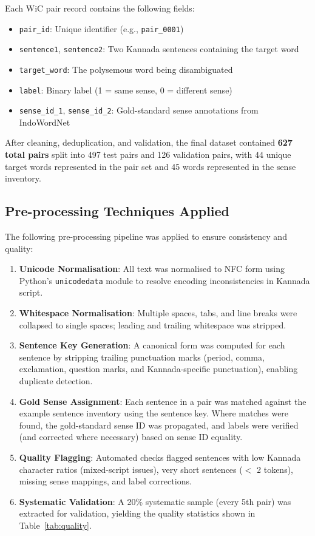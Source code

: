 \documentclass[12pt,a4paper,oneside]{article}
\begin{document}
Each WiC pair record contains the following fields:
\begin{itemize}[leftmargin=*]
  \item \texttt{pair\_id}: Unique identifier (e.g., \texttt{pair\_0001})
  \item \texttt{sentence1}, \texttt{sentence2}: Two Kannada sentences containing the target word
  \item \texttt{target\_word}: The polysemous word being disambiguated
  \item \texttt{label}: Binary label (1 = same sense, 0 = different sense)
  \item \texttt{sense\_id\_1}, \texttt{sense\_id\_2}: Gold-standard sense annotations from IndoWordNet
\end{itemize}

After cleaning, deduplication, and validation, the final dataset contained \textbf{627 total pairs} split into 497 test pairs and 126 validation pairs, with 44 unique target words represented in the pair set and 45 words represented in the sense inventory.

\subsection{Pre-processing Techniques Applied}

The following pre-processing pipeline was applied to ensure consistency and quality:

\begin{enumerate}[leftmargin=*]
  \item \textbf{Unicode Normalisation}: All text was normalised to NFC form using Python's \texttt{unicodedata} module to resolve encoding inconsistencies in Kannada script.

  \item \textbf{Whitespace Normalisation}: Multiple spaces, tabs, and line breaks were collapsed to single spaces; leading and trailing whitespace was stripped.

  \item \textbf{Sentence Key Generation}: A canonical form was computed for each sentence by stripping trailing punctuation marks (period, comma, exclamation, question marks, and Kannada-specific punctuation), enabling duplicate detection.

  \item \textbf{Gold Sense Assignment}: Each sentence in a pair was matched against the example sentence inventory using the sentence key. Where matches were found, the gold-standard sense ID was propagated, and labels were verified (and corrected where necessary) based on sense ID equality.

  \item \textbf{Quality Flagging}: Automated checks flagged sentences with low Kannada character ratios (mixed-script issues), very short sentences ($<$ 2 tokens), missing sense mappings, and label corrections.

  \item \textbf{Systematic Validation}: A 20\% systematic sample (every 5th pair) was extracted for validation, yielding the quality statistics shown in Table~\ref{tab:quality}.
\end{enumerate}
\end{document}
